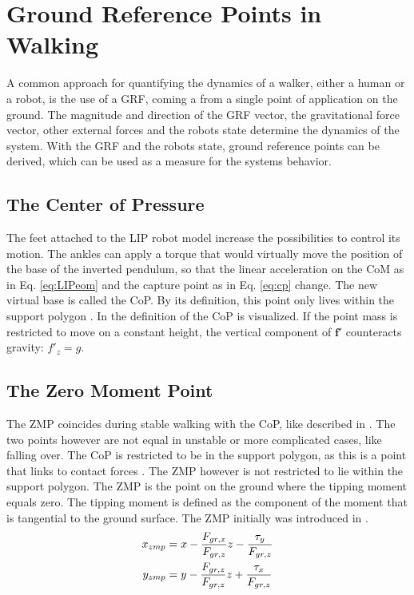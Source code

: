 \section{Ground Reference Points in Walking}\label{sec:grp}
A common approach for quantifying the dynamics of a walker, either a human or a robot, is the use of a \ac{GRF}, coming a from a single point of application on the ground. The magnitude and direction of the \ac{GRF} vector, the gravitational force vector, other external forces and the robots state determine the dynamics of the system. With the \ac{GRF} and the robots state, ground reference points can be derived, which can be used as a measure for the systems behavior.

\subsection{The Center of Pressure}
The feet attached to the \ac{LIP} robot model increase the possibilities to control its motion. The ankles can apply a torque that would virtually move the position of the base of the inverted pendulum, so that the linear acceleration on the \ac{CoM} as in Eq. \eqref{eq:LIPeom} and the capture point as in Eq. \eqref{eq:cp} change. The new virtual base is called the \ac{CoP}. By its definition, this point only lives within the support polygon \cite{vukobratovic2004zero}. In  the definition of the \ac{CoP} is visualized. If the point mass is restricted to move on a constant height, the vertical component of $\boldsymbol{f'}$ counteracts gravity: $f'_z=g$. 

\subsection{The Zero Moment Point}
The \ac{ZMP} coincides during stable walking with the \ac{CoP}, like described in \cite{vukobratovic2004zero}. The two points however are not equal in unstable or more complicated cases, like falling over.  The \ac{CoP} is restricted to be in the support polygon, as this is a point that links to contact forces \cite{sardain2004forces}. The \ac{ZMP} however is not restricted to lie within the support polygon. The \ac{ZMP} is the point on the ground where the tipping moment equals zero. The tipping moment is defined as the component of the moment that is tangential to the ground surface. The \ac{ZMP} initially was introduced in \cite{vukobratovic1969contribution}.
\begin{align}
    x_{zmp}&=x-\frac{F_{gr,x}}{F_{gr,z}}z-\frac{\tau_y}{F_{gr,z}}\\
    y_{zmp}&=y-\frac{F_{gr,z}}{F_{gr,z}}z+\frac{\tau_x}{F_{gr,z}}
\end{align}

